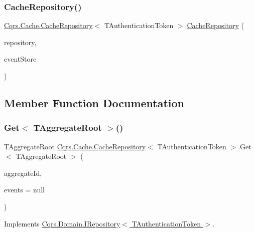 \subsubsection{\texorpdfstring{Cache\+Repository()}{CacheRepository()}}
{\footnotesize\ttfamily \hyperlink{classCqrs_1_1Cache_1_1CacheRepository}{Cqrs.\+Cache.\+Cache\+Repository}$<$ T\+Authentication\+Token $>$.\hyperlink{classCqrs_1_1Cache_1_1CacheRepository}{Cache\+Repository} (\begin{DoxyParamCaption}\item[{\hyperlink{interfaceCqrs_1_1Domain_1_1IRepository}{I\+Repository}$<$ T\+Authentication\+Token $>$}]{repository,  }\item[{\hyperlink{interfaceCqrs_1_1Events_1_1IEventStore}{I\+Event\+Store}$<$ T\+Authentication\+Token $>$}]{event\+Store }\end{DoxyParamCaption})}



\subsection{Member Function Documentation}
\mbox{\label{classCqrs_1_1Cache_1_1CacheRepository_ab0e3de3ba5dcfab8827fed714a8b8944}} 
\subsubsection{\texorpdfstring{Get$<$ T\+Aggregate\+Root $>$()}{Get< TAggregateRoot >()}}
{\footnotesize\ttfamily T\+Aggregate\+Root \hyperlink{classCqrs_1_1Cache_1_1CacheRepository}{Cqrs.\+Cache.\+Cache\+Repository}$<$ T\+Authentication\+Token $>$.Get$<$ T\+Aggregate\+Root $>$ (\begin{DoxyParamCaption}\item[{Guid}]{aggregate\+Id,  }\item[{I\+List$<$ \hyperlink{interfaceCqrs_1_1Events_1_1IEvent}{I\+Event}$<$ T\+Authentication\+Token $>$$>$}]{events = {\ttfamily null} }\end{DoxyParamCaption})}



Implements \hyperlink{interfaceCqrs_1_1Domain_1_1IRepository_a9a6f6fe2ae808009344f1eb8ad96f448}{Cqrs.\+Domain.\+I\+Repository$<$ T\+Authentication\+Token $>$}.

